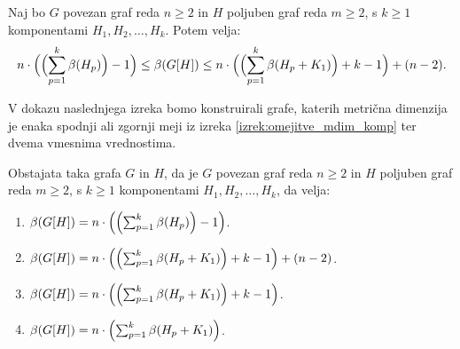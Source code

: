 \documentclass[mat1, tisk]{fmfdelo}
\newcommand{\1}{(1, 1, \ldots, 1)}
\newcommand{\2}{(2, 2, \ldots, 2)}
\begin{document}
\begin{izrek} \label{izrek:omejitve_mdim_komp}
    Naj bo $G$ povezan graf reda $n \geq 2$ in $H$ poljuben graf reda $m \geq 2$, s $k \geq 1$ 
    komponentami $H_1, H_2, \ldots , H_k$. Potem velja:
    $$
    n \cdot \Bigl ( \Bigl ( \sum_{p=1}^{k} \beta(H_p) \Bigr )  - 1  \Bigr ) 
    \leq \beta(G[H]) \leq 
    n \cdot \Bigl ( \Bigl ( \sum_{p=1}^{k} \beta(H_p + K_1) \Bigr ) + k - 1  \Bigr ) + (n-2). 
    $$
    \end{izrek}
    
    
    V dokazu naslednjega izreka bomo konstruirali grafe, katerih metrična dimenzija je enaka
    spodnji ali zgornji meji iz izreka \ref{izrek:omejitve_mdim_komp} ter dvema vmesnima vrednostima.
    
    \begin{izrek} \label{izrek:primeri_mdim_komp}
    Obstajata taka grafa $G$ in $H$, da je $G$ povezan graf reda $n \geq 2$ in $H$ poljuben graf 
    reda $m \geq 2$, s $k \geq 1$ komponentami $H_1, H_2, \dots , H_k$, da velja:
    \begin{enumerate}
        \item $\beta(G[H]) = n \cdot \Bigl ( \Bigl ( \sum_{p=1}^{k} \beta(H_p) \Bigr )  - 1  \Bigr )$.
        \item $\beta(G[H]) = n \cdot \Bigl ( \Bigl ( \sum_{p=1}^{k} \beta(H_p + K_1) \Bigr ) + k - 1 
         \Bigr ) + (n-2)$.
        \item $\beta(G[H]) = n \cdot \Bigl ( \Bigl ( \sum_{p=1}^{k} \beta(H_p + K_1) \Bigr ) + k - 1  
        \Bigr )$.
        \item $\beta(G[H]) = n \cdot \Bigl ( \sum_{p=1}^{k} \beta(H_p + K_1) \Bigr ) $.
    \end{enumerate}
    \end{izrek}
    
\end{document}
